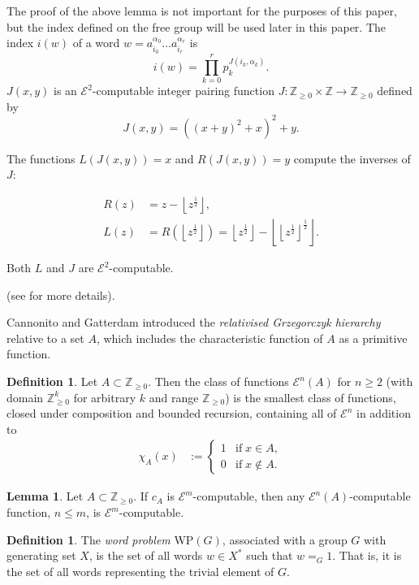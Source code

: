 \documentclass[a4paper]{article}
\newcommand{\grz}[1]{$\mathcal{E}^{#1}$}	%
\newcommand{\ZZ}{\mathbb{Z}}
\theoremstyle{plain}
\theoremstyle{definition}
\newtheorem{lemma}[theorem]{Lemma}
\newtheorem{definition}[theorem]{Definition}
\begin{document}
The proof of the above lemma is not important for the purposes of this paper, but the index defined on the free group will be used later in this paper. The index $i(w)$ of a word $w = a_{i_0}^{\alpha_0} \dots a_{i_r}^{\alpha_r}$ is
\[ i(w) = \prod_{k=0}^r p_k^{J(i_k,\alpha_k)}. \]
$J(x,y)$ is an \grz{2}-computable integer pairing function $J:\ZZ_{\geq 0} \times \ZZ \rightarrow \ZZ_{\geq 0}$ defined by 
\[J(x,y)=((x+y)^2+x)^2+y.\]

The functions $L(J(x,y)) = x$ and $R(J(x,y)) = y$ compute the inverses of $J$:

\begin{align}
	R(z) &= z - \left\lfloor z^{\frac{1}{2}} \right\rfloor, \\
	L(z) &= R \left( \left\lfloor z^{\frac{1}{2}} \right\rfloor \right) = \left\lfloor z^{\frac{1}{2}} \right\rfloor - \left \lfloor \left \lfloor z^{\frac{1}{2}} \right\rfloor^{\frac{1}{2}} \right \rfloor. 
\end{align}

Both $L$ and $J$ are \grz{2}-computable.

(see \cite{Cannonito_1973} for more details).

Cannonito and Gatterdam \cite{Cannonito_1973} introduced the {\it relativised Grzegorczyk hierarchy} relative to a set $A$, which includes the characteristic function of $A$ as a primitive function.

\begin{definition} \cite[Definition 2.3]{Cannonito_1973}
	Let $A \subset \ZZ_{\geq 0}$. Then the class of functions \grz{n}$(A)$ for $n \geq 2$ (with domain $\ZZ_{\geq 0}^k$ for arbitrary $k$ and range $\ZZ_{\geq 0}$) is the smallest class of functions, closed under composition and bounded recursion, containing all of \grz{n} in addition to 
	\begin{align}
		\chi_A(x) &:= \begin{cases}
									1 & \textrm{if}\; x \in A, \\
									0 & \textrm{if}\;  x \notin A.
							\end{cases}
	\end{align}
\end{definition}
\begin{lemma} \label{relativetonormalcomputable}
	Let $A \subset \ZZ_{\geq 0}$. If $c_A$ is \grz{m}-computable, then any \grz{n}$(A)$-computable function, $n \leq m$, is \grz{m}-computable.
\end{lemma}

\begin{definition}
	The {\it word problem} WP$(G)$, associated with a group $G$ with generating set $X$, is the set of all words $w \in X^{\ast}$ such that $w =_G 1$. That is, it is the set of all words representing the trivial element of $G$.
\end{definition}
\end{document}
